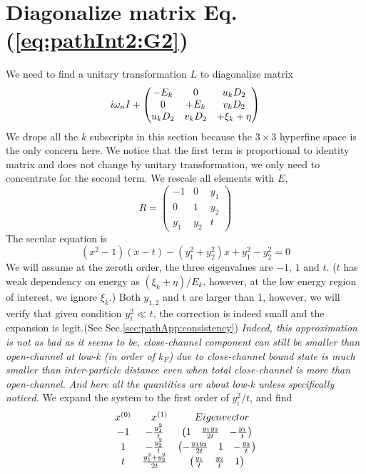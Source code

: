 

\section{Diagonalize matrix Eq. (\ref{eq:pathInt2:G2})\label{sec:diagonalize}}
We need to find a unitary transformation $L$ to diagonalize matrix 
\begin{equation*}
i\omega_{n}I+\begin{pmatrix}-E_k&0&u _kD_2\\0&+E_k&v_kD_2\\u_kD_2&v_kD_2&+\xi_k+\eta\end{pmatrix}
\end{equation*}
We drops all the $k$ subscripts in this section because the $3\times3$ hyperfine space is the only concern here.  We notice that the first term is proportional to identity matrix and does not change by unitary transformation, we only need to concentrate for the second term.  We rescale all elements with $E$, 
\begin{equation*}
R=
\begin{pmatrix}
-1&0&y_1\\
0&1&y_2\\
y_1&y_2&t
\end{pmatrix}
\end{equation*}
The secular equation is 
\begin{equation}\label{eq:pahtApp:secular}
(x^{2}-1)(x-t)-(y_{1}^{2}+y_{2}^{2})x+y_{1}^{2}-y_{2}^{2}=0
\end{equation}
We will assume at the zeroth order, the three eigenvalues are $-1$, $1$ and $t$.  ($t$ has weak dependency on energy as $(\xi_{k}+\eta)/E_{k}$, however, at the low energy region of interest, we ignore $\xi_{k}$.) Both $y_{1,2}$ and t are larger than 1, however, we will verify that given condition $y_{i}^{2}\ll{t}$, the correction is indeed small and the expansion is legit.(See Sec.\ref{sec:pathApp:consistency})  \emph{Indeed, this approximation is not as bad as it seems to be, close-channel component can still be smaller than open-channel at low-k (in order of $k_{F}$)  due to close-channel bound state is much smaller than inter-particle distance even when total close-channel is more than open-channel.  And here all the quantities are about low-k unless specifically noticed.} 
We expand the system to the first order of $y_{i}^{2}/{t}$, and find
\begin{equation}
\begin{array}{ccc}
x^{(0)}&\quad{}x^{(1)}&\quad{}Eigenvector\nonumber\\
-1&-\frac{y_{1}^{2}}{t}&\begin{pmatrix}1&\frac{y_{1}y_{2}}{2t}&-\frac{y_{1}}{t}\end{pmatrix}\\
1&-\frac{y_{2}^{2}}{t}&\begin{pmatrix}-\frac{y_{1}y_{2}}{2t}&1&-\frac{y_{2}}{t}\end{pmatrix}\\
t&\frac{y_{1}^{2}+y_{2}^{2}}{2t}&\begin{pmatrix}\frac{y_{1}}{t}&\frac{y_{2}}{t}&1\end{pmatrix}
\end{array}
\end{equation}
